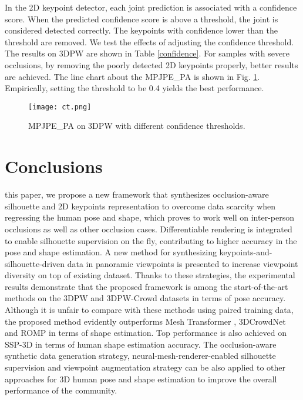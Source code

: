 \documentclass[journal]{IEEEtran}
\begin{document}
In the 2D keypoint detector, each joint prediction is associated with a confidence score. When the predicted confidence score is above a threshold, the joint is considered detected correctly. The keypoints with confidence lower than the threshold are removed. We test the effects of adjusting the confidence threshold.  The results on 3DPW are shown in Table \ref{confidence}.  For samples with severe occlusions, by removing the poorly detected 2D keypoints properly, better results are achieved. The line chart about the MPJPE\_PA is shown in Fig. \ref{fig:confidence}. Empirically, setting the threshold to be 0.4 yields the best performance.

\begin{figure}[htbp]
    \centerline{\texttt{[image: ct.png]}}
\caption{MPJPE\_PA on 3DPW with different confidence thresholds.}
    \label{fig:confidence}
\end{figure}

\section{Conclusions}
 this paper, we propose a new framework that synthesizes occlusion-aware silhouette and 2D keypoints representation to overcome data scarcity when regressing the human pose and shape, which proves to work well on inter-person occlusions as well as other occlusion cases. Differentiable rendering is integrated to enable silhouette supervision on the fly, contributing to higher accuracy in the pose and shape estimation. A new method for synthesizing keypoints-and-silhouette-driven data in panoramic viewpoints is presented to increase viewpoint diversity on top of existing dataset. Thanks to these strategies, the experimental results demonstrate that the proposed framework is among the start-of-the-art methods on the 3DPW and 3DPW-Crowd datasets in terms of pose accuracy. Although it is unfair to compare with these methods using paired training data, the proposed method evidently outperforms Mesh Transformer \cite{lin2021end-to-end}, 3DCrowdNet \cite{choi20213dcrowdnet} and ROMP \cite{ROMP} in terms of shape estimation. Top performance is also achieved on SSP-3D in terms of human shape estimation accuracy. The occlusion-aware synthetic data generation strategy, neural-mesh-renderer-enabled silhouette supervision and viewpoint augmentation strategy can be also applied to other approaches for 3D human pose and shape estimation to improve the overall performance of the community.
\end{document}
